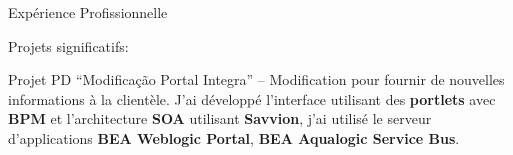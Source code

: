 \documentclass{resume}
\begin{document}
\begin{rSection}{Expérience Profissionnelle}
\begin{rSubsection}{Projets significatifs:}{}{}{}
    \item Projet PD “Modificação Portal Integra” – Modification pour fournir de nouvelles informations à la clientèle. J'ai développé l'interface  utilisant des \textbf{portlets} avec \textbf{BPM} et l'architecture \textbf{SOA} utilisant \textbf{Savvion}, j'ai utilisé le serveur d'applications \textbf{BEA Weblogic Portal}, \textbf{BEA Aqualogic Service Bus}.\\

\end{rSubsection}
\end{rSection}
\end{document}
